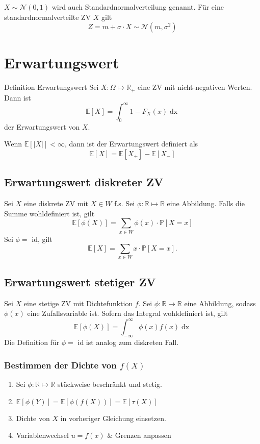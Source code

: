 \documentclass[a4paper,10pt]{article}
\def\R{\mathbb{R}}
\def\P{\mathbb{P}}
\def\E{\mathbb{E}}
\begin{document}
\(X \sim \mathcal{N}(0,1)\) wird auch Standardnormalverteilung genannt. Für eine standardnormalverteilte ZV \(X\) gilt
\[Z = m +\sigma \cdot X \sim \mathcal{N}(m, \sigma^2)\]

\section{Erwartungswert}
\begin{mainbox}{Definition Erwartungswert}
	Sei \(X: \Omega \mapsto \R_+\) eine ZV mit nicht-negativen Werten. Dann ist
	\[\E[X] = \int_0^\infty 1- F_X(x) \mathop{dx}\]
	der Erwartungswert von \(X\).
\end{mainbox}
Wenn \(\E[|X|] < \infty\), dann ist der Erwartungswert definiert als
\[\E[X] = \E[X_+] - \E[X_-]\]

\subsection{Erwartungswert diskreter ZV}
Sei \(X\) eine diskrete ZV mit \(X \in W\) f.s. Sei \(\phi: \R \mapsto \R\) eine Abbildung. Falls die Summe wohldefiniert ist, gilt
\[\E[\phi(X)] = \sum_{x\in W} \phi(x)\cdot \P[X=x]\]
Sei \(\phi = \) id, gilt
\[
	\E[X] = \sum_{x\in W} x \cdot \P[X=x]
	.\]

\subsection{Erwartungswert stetiger ZV}
Sei \(X\) eine stetige ZV mit Dichtefunktion \(f\). Sei \(\phi :\R\mapsto \R\) eine Abbildung, sodass \(\phi(x)\) eine Zufallsvariable ist. Sofern das Integral wohldefiniert ist, gilt
\[\E[\phi(X)] = \int_{-\infty}^{\infty}\phi(x)f(x) \mathop{dx}\]
Die Definition für \(\phi = \) id ist analog zum diskreten Fall.
\subsubsection{\texorpdfstring{Bestimmen der Dichte von \(f(X)\)}{Bestimmen der Dichte von f(X)}}
\begin{enumerate}
	\item Sei \(\phi: \R \mapsto \R\) stückweise beschränkt und stetig.
	\item \(\E[\phi(Y)] = \E[\phi(f(X))] = \E[\tau(X)]\)
	\item Dichte von \(X\) in vorheriger Gleichung einsetzen.
	\item Variablenwechsel \(u = f(x)\) \& Grenzen anpassen
\end{enumerate}
\end{document}
